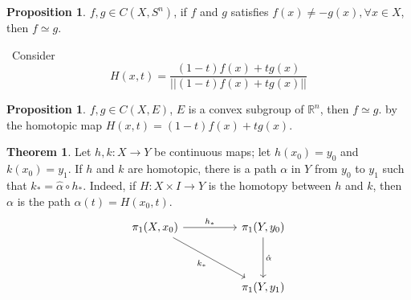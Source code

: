\documentclass[12pt,a4paper]{book}
\newenvironment{prooff}{{\noindent\it\textcolor{cyan!40!black}{Proof}:}\,}{\par}
\newcommand{\bb}[1]{\mathbb{#1}}
\theoremstyle{definition}
\newtheorem{theo}[defn]{Theorem}
\newtheorem{prop}[defn]{Proposition}
\begin{document}
\begin{prop}
    $f,g\in C(X,S^n)$, if $f$ and $g$ satisfies $f(x)\neq -g(x),\forall x\in X$, then $f\simeq g$.
\end{prop}
\begin{prooff}
    Consider
    \begin{equation*}
        H(x,t)=\frac{(1-t)f(x)+tg(x)}{||(1-t)f(x)+tg(x)||}
    \end{equation*}
\end{prooff}
\begin{prop}
    $f,g\in C(X,E)$, $E$ is a convex subgroup of $\bb{R}^n$, then $f\simeq g$.
    by the homotopic map $H(x,t)=(1-t)f(x)+tg(x)$.
\end{prop}

\begin{theo}
    Let $h, k: X \rightarrow Y$ be continuous maps; let $h\left(x_0\right)=y_0$ and $k\left(x_0\right)=y_1$. If $h$ and $k$ are homotopic, there is a path $\alpha$ in $Y$ from $y_0$ to $y_1$ such that $k_*=\hat{\alpha} \circ h_*$. Indeed, if $H: X \times I \rightarrow Y$ is the homotopy between $h$ and $k$, then $\alpha$ is the path $\alpha(t)=H\left(x_0, t\right)$.
    \[\begin{tikzcd}
            {\pi_1(X,x_0)} && {\pi_1(Y,y_0)} \\
            \\
            && {\pi_1(Y,y_1)}
            \arrow["{h_*}", from=1-1, to=1-3]
            \arrow["{\hat{\alpha}}", from=1-3, to=3-3]
            \arrow["{k_*}"', from=1-1, to=3-3]
        \end{tikzcd}\]
\end{theo}
\end{document}
